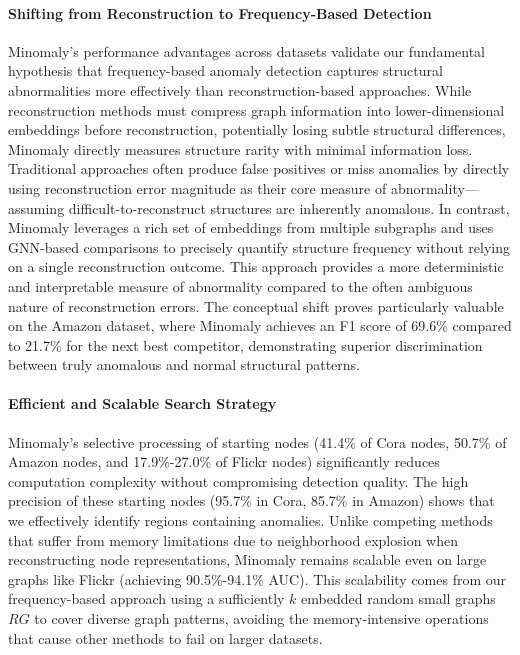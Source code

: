 \documentclass[pdflatex,sn-mathphys-num]{sn-jnl}%
\theoremstyle{thmstyleone}%
\theoremstyle{thmstyletwo}%
\theoremstyle{thmstylethree}%
\begin{document}
\paragraph{Shifting from Reconstruction to Frequency-Based Detection}
Minomaly's performance advantages across datasets validate our fundamental hypothesis that frequency-based anomaly detection captures structural abnormalities more effectively than reconstruction-based approaches. While reconstruction methods must compress graph information into lower-dimensional embeddings before reconstruction, potentially losing subtle structural differences, Minomaly directly measures structure rarity with minimal information loss. Traditional approaches often produce false positives or miss anomalies by directly using reconstruction error magnitude as their core measure of abnormality—assuming difficult-to-reconstruct structures are inherently anomalous. In contrast, Minomaly leverages a rich set of embeddings from multiple subgraphs and uses GNN-based comparisons to precisely quantify structure frequency without relying on a single reconstruction outcome. This approach provides a more deterministic and interpretable measure of abnormality compared to the often ambiguous nature of reconstruction errors. The conceptual shift proves particularly valuable on the Amazon dataset, where Minomaly achieves an F1 score of 69.6\% compared to 21.7\% for the next best competitor, demonstrating superior discrimination between truly anomalous and normal structural patterns.

\paragraph{Efficient and Scalable Search Strategy} Minomaly's selective processing of starting nodes (41.4\% of Cora nodes, 50.7\% of Amazon nodes, and 17.9\%-27.0\% of Flickr nodes) significantly reduces computation complexity without compromising detection quality. The high precision of these starting nodes (95.7\% in Cora, 85.7\% in Amazon) shows that we effectively identify regions containing anomalies. Unlike competing methods that suffer from memory limitations due to neighborhood explosion when reconstructing node representations, Minomaly remains scalable even on large graphs like Flickr (achieving 90.5\%-94.1\% AUC). This scalability comes from our frequency-based approach using a sufficiently $k$ embedded random small graphs  $RG$ to cover diverse graph patterns, avoiding the memory-intensive operations that cause other methods to fail on larger datasets.
\end{document}
